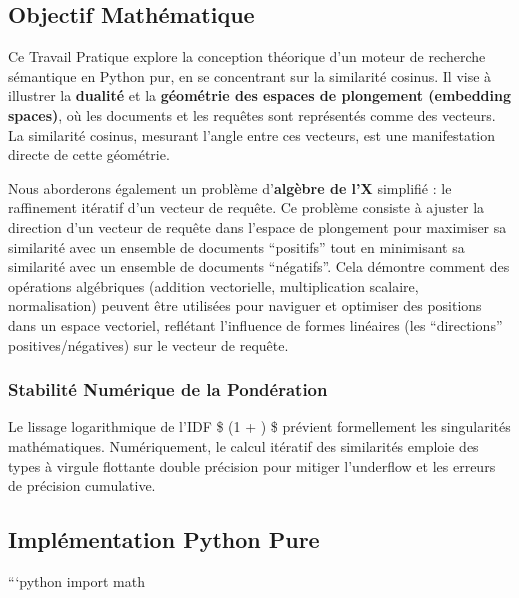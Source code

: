 \documentclass[11pt,a4paper]{report}
\begin{document}
\hypertarget{objectif-mathuxe9matique}{%
\subsection{Objectif Mathématique}\label{objectif-mathuxe9matique}}

Ce Travail Pratique explore la conception théorique d'un moteur de
recherche sémantique en Python pur, en se concentrant sur la similarité
cosinus. Il vise à illustrer la \textbf{dualité} et la \textbf{géométrie
des espaces de plongement (embedding spaces)}, où les documents et les
requêtes sont représentés comme des vecteurs. La similarité cosinus,
mesurant l'angle entre ces vecteurs, est une manifestation directe de
cette géométrie.

Nous aborderons également un problème d'\textbf{algèbre de l'X}
simplifié : le raffinement itératif d'un vecteur de requête. Ce problème
consiste à ajuster la direction d'un vecteur de requête dans l'espace de
plongement pour maximiser sa similarité avec un ensemble de documents
``positifs'' tout en minimisant sa similarité avec un ensemble de
documents ``négatifs''. Cela démontre comment des opérations algébriques
(addition vectorielle, multiplication scalaire, normalisation) peuvent
être utilisées pour naviguer et optimiser des positions dans un espace
vectoriel, reflétant l'influence de formes linéaires (les ``directions''
positives/négatives) sur le vecteur de requête.

\hypertarget{stabilituxe9-numuxe9rique-de-la-ponduxe9ration}{%
\subsubsection{Stabilité Numérique de la
Pondération}\label{stabilituxe9-numuxe9rique-de-la-ponduxe9ration}}

Le lissage logarithmique de l'IDF \$ \log(1 + ) \$
prévient formellement les singularités mathématiques. Numériquement, le
calcul itératif des similarités emploie des types à virgule flottante
double précision pour mitiger l'underflow et les erreurs de précision
cumulative.

\hypertarget{impluxe9mentation-python-pure}{%
\subsection{Implémentation Python
Pure}\label{impluxe9mentation-python-pure}}

```python import math
\end{document}
